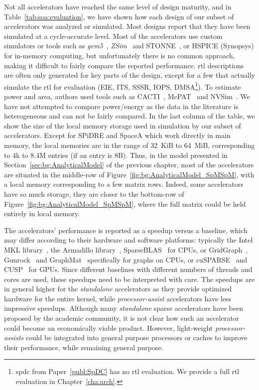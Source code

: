 Not all accelerators have reached the same level of design maturity, and in Table~\ref{tab:soa:evaluation}, we have shown how each design of our subset of accelerators was analyzed or simulated.
Most designs report that they have been simulated at a cycle-accurate level.
Most of the accelerators use custom simulators or tools such as \textit{gem5}~\cite{Lowe2020_gem5}, \textit{ZSim}~\cite{SANCHEZ_2013_ZSIM} and STONNE~\cite{Munoz-Martinez2021_STONNE}, or HSPICE (Synopsys\textregistered) for in-memory computing, but unfortunately there is no common approach, making it difficult to fairly compare the reported performance.
\acrshort{rtl} descriptions are often only generated for key parts of the design, except for a few that actually simulate the \acrshort{rtl} for evaluation (\eg EIE, ITS, SSSR, IOPS, DMSA\footnote{\acrlong{spdc} from Paper~\ref{publ:SpDC} has no \acrshort{rtl} evaluation. We provide a full \acrshort{rtl} evaluation in Chapter~\ref{cha:arch}.}).
To estimate power and area, authors used tools such as CACTI~\cite{Balasubramonian2017_CACTI7}, McPAT~\cite{Li2009_McPAT} and NVSim~\cite{Dong2012_NVSim}.
We have not attempted to compare power/energy as the data in the literature is heterogeneous and can not be fairly compared.
In the last column of the table, we show the size of the local memory storage used in simulation by our subset of accelerators.
Except for SPiDRE and SpaceA which work directly in main memory, the local memories are in the range of 32~KiB to 64~MiB, corresponding to 4k to 8.4M entries (if an entry is 8B).
Thus, in the model presented in Section~\ref{sec:bg:AnalyticalModel} of the previous chapter, most of the accelerators are situated in the middle-row of Figure~\ref{fig:bg:AnalyticalModel_SpMSpM}, with a local memory corresponding to a few matrix rows.
Indeed, some accelerators have so much storage, they are closer to the bottom-row of Figure~\ref{fig:bg:AnalyticalModel_SpMSpM}, where the full matrix could be held entirely in local memory.

The accelerators' performance is reported as a speedup versus a baseline, which may differ according to their hardware and software platforms: typically the Intel MKL library~\cite{Intel2003_IntelMKL}, the Armadillo library~\cite{Conrad2016_Armadillo}, SparseBLAS~\cite{Duff2002_SparseBLAS} for CPUs, or GridGraph~\cite{Zhu2015_GridGraph}, Gunrock~\cite{Wang2016_Gunrock} and GraphMat~\cite{Sundaram2015_GraphMat} specifically for graphs on CPUs, or cuSPARSE~\cite{NVIDIA2014_cuSPARSE} and CUSP~\cite{Dalton2014_Cusp} for GPUs.
Since different baselines with different numbers of threads and cores are used, these speedups need to be interpreted with care.
The speedups are in general higher for the \textit{standalone} accelerators as they provide optimized hardware for the entire kernel, while \textit{processor-assist} accelerators have less impressive speedups.
Although many \textit{standalone} sparse accelerators have been proposed by the academic community, it is not clear how such an accelerator could become an economically viable product.
However, light-weight \textit{processor-assists} could be integrated into general purpose processors or caches to improve their performance, while remaining general purpose.

